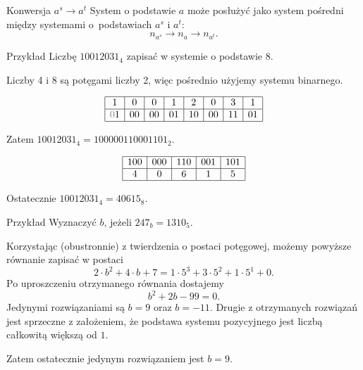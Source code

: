 \documentclass[a4paper,10pt]{beamer}
\begin{document}
\begin{frame}
	
	\begin{block}{Konwersja $a^s \to a^t$}
		System o podstawie $a$ może posłużyć jako system pośredni między systemami o~podstawiach $a^s$ i $a^t$:
		$$n_{a^s}\to n_a\to n_{a^t}.$$
	\end{block}

	\begin{exampleblock}{Przykład}
		Liczbę $10012031_4$ zapisać w systemie o podstawie 8.
		
		Liczby 4 i 8 są potęgami liczby 2, więc pośrednio użyjemy systemu binarnego.
		
		$$\begin{array}{|c|c|c|c|c|c|c|c|}\hline
		1&0&0&1&2&0&3&1\\\hline
		\textcolor{gray}{0}1&00&00&01&10&00&11&01\\\hline
		\end{array}$$
		
		Zatem $10012031_4=100000110001101_2$.
		
		$$\begin{array}{|c|c|c|c|c|}\hline
		100&000&110&001&101\\\hline
		4&0&6&1&5\\\hline
		\end{array}$$
		
		Ostatecznie $10012031_4=40615_8$.
	\end{exampleblock}
	
\end{frame}





\begin{frame}

\begin{exampleblock}{Przykład}
Wyznaczyć $b$, jeżeli $247_b=1310_5$.

Korzystając (obustronnie) z twierdzenia o postaci potęgowej, możemy powyższe równanie zapisać w postaci
$$2\cdot b^2+4\cdot b+7=1\cdot5^3+3\cdot5^2+1\cdot5^1+0.$$
Po uproszczeniu otrzymanego równania dostajemy
$$b^2+2b-99=0.$$
Jedynymi rozwiązaniami są $b=9$ oraz $b=-11$. Drugie z otrzymanych rozwiązań jest sprzeczne z założeniem, że podstawa systemu pozycyjnego jest liczbą całkowitą większą od $1$. 

Zatem ostatecznie  jedynym rozwiązaniem jest $b=9$.
\end{exampleblock}


\end{frame}
\end{document}
